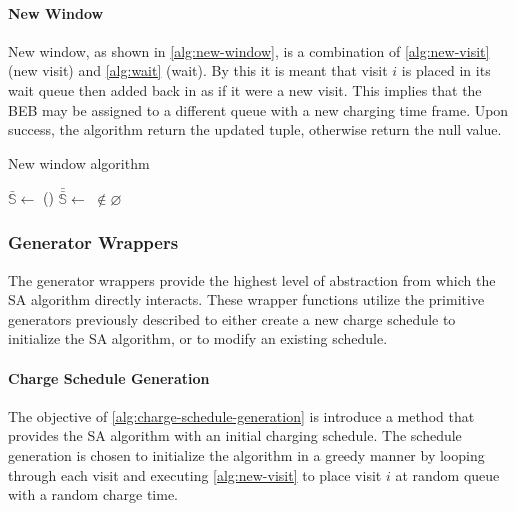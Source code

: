\documentclass[energies,article,submit,moreauthors]{Definitions/mdpi}
\newcommand{\Sol}{\mathbb{S}}               %
\begin{document}
\paragraph{New Window}
\label{sec:sa-new-window}
New window, as shown in \ref{alg:new-window}, is a combination of \ref{alg:new-visit} (new visit) and \ref{alg:wait}
(wait). By this it is meant that visit \(i\) is placed in its wait queue then added back in as if it were a new visit.
This implies that the BEB may be assigned to a different queue with a new charging time frame. Upon success, the
algorithm return the updated tuple, otherwise return the null value.

\begin{algorithm}[H]
  \scriptsize
  \caption{New window algorithm} \label{alg:new-window}
  \LinesNumbered
  \KwIn{$\Sol$}
  \KwOut{$\bar{\Sol}$}


  \Begin
  {
    $\bar{\Sol} \leftarrow$\Wait{$\Sol$}
    \If()
       {
         $\bar{\bar{\Sol}} \leftarrow$ \NewVisit{$\bar{\Sol}$} $\not\in \varnothing$
       }
       {
         \Return{$\bar{\bar{\Sol}}$} 
       }

       \Return{($\varnothing$)}
  }
\end{algorithm}

\subsubsection{Generator Wrappers}
\label{sec:sa-generator-wrappers}
The generator wrappers provide the highest level of abstraction from which the SA algorithm directly interacts. These
wrapper functions utilize the primitive generators previously described to either create a new charge schedule to
initialize the SA algorithm, or to modify an existing schedule.

\paragraph{Charge Schedule Generation}
\label{sec:sa-charge-schedule-generation}
The objective of \ref{alg:charge-schedule-generation} is introduce a method that provides the SA algorithm with an
initial charging schedule. The schedule generation is chosen to initialize the algorithm in a greedy manner by looping
through each visit and executing \ref{alg:new-visit} to place visit \(i\) at random queue with a random charge time.
\end{document}
